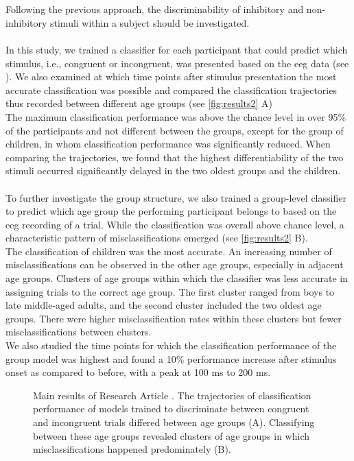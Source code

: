 \\
\\
Following the previous approach, the discriminability of inhibitory and non-inhibitory stimuli within a subject should be investigated.\\
\\
In this study, we trained a classifier for each participant that could predict which stimulus, i.e., congruent or incongruent, was presented based on the \gls{eeg} data (see ). We also examined at which time points after stimulus presentation the most accurate classification was possible and compared the classification trajectories thus recorded between different age groups (see \autoref{fig:results2} A)\\
The maximum classification performance was above the chance level in over 95\% of the participants and not different between the groups, except for the group of children, in whom classification performance was significantly reduced. When comparing the trajectories, we found that the highest differentiability of the two stimuli occurred significantly delayed in the two oldest groups and the children.\\
\\
To further investigate the group structure, we also trained a group-level classifier to predict which age group the performing participant belongs to based on the \gls{eeg} recording of a trial. While the classification was overall above chance level, a characteristic pattern of misclassifications emerged (see \autoref{fig:results2} B). \\
The classification of children was the most accurate. An increasing number of misclassifications can be observed in the other age groups, especially in adjacent age groups. Clusters of age groups within which the classifier was less accurate in assigning trials to the correct age group. The first cluster ranged from boys to late middle-aged adults, and the second cluster included the two oldest age groups. There were higher misclassification rates within these clusters but fewer misclassifications between clusters.\\
We also studied the time points for which the classification performance of the group model was highest and found a 10\% performance increase after stimulus onset as compared to before, with a peak at 100 ms to 200 ms.

\begin{figure}[h]
\begin{center}

\caption[Main results of Research Article .]{Main results of Research Article . The trajectories of classification performance of models trained to discriminate between congruent and incongruent trials differed between age groups (A). Classifying between these age groups revealed clusters of age groups in which misclassifications happened predominately (B).}
\label{fig:results2}
\end{center}
\end{figure}

